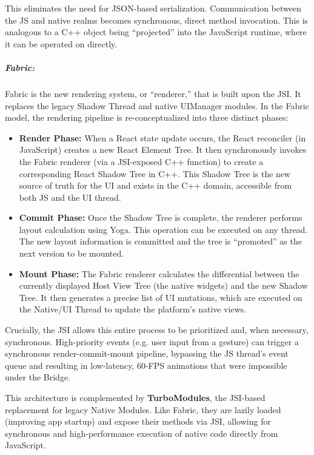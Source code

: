     This eliminates the need for JSON-based serialization. Communication between the JS and native realms becomes synchronous, direct method invocation. This is analogous to a C++ object being ``projected'' into the JavaScript runtime, where it can be operated on directly.
    
    \subparagraph{Fabric:} Fabric is the new rendering system, or ``renderer,'' that is built upon the JSI. It replaces the legacy Shadow Thread and native UIManager modules. In the Fabric model, the rendering pipeline is re-conceptualized into three distinct phases:

    \begin{itemize}
        \item \textbf{Render Phase:} When a React state update occurs, the React reconciler (in JavaScript) creates a new React Element Tree. It then synchronously invokes the Fabric renderer (via a JSI-exposed C++ function) to create a corresponding React Shadow Tree in C++. This Shadow Tree is the new source of truth for the UI and exists in the C++ domain, accessible from both JS and the UI thread.

        \item \textbf{Commit Phase:} Once the Shadow Tree is complete, the renderer performs layout calculation using Yoga. This operation can be executed on any thread. The new layout information is committed and the tree is ``promoted'' as the next version to be mounted.

        \item \textbf{Mount Phase:} The Fabric renderer calculates the differential between the currently displayed Host View Tree (the native widgets) and the new Shadow Tree. It then generates a precise list of UI mutations, which are executed on the Native/UI Thread to update the platform's native views.
    \end{itemize}
    
    Crucially, the JSI allows this entire process to be prioritized and, when necessary, synchronous. High-priority events (e.g. user input from a gesture) can trigger a synchronous render-commit-mount pipeline, bypassing the JS thread's event queue and resulting in low-latency, 60-FPS animations that were impossible under the Bridge. 
    
    This architecture is complemented by \textbf{TurboModules}, the JSI-based replacement for legacy Native Modules. Like Fabric, they are lazily loaded (improving app startup) and expose their methods via JSI, allowing for synchronous and high-performance execution of native code directly from JavaScript. \cite{React:03}
        
